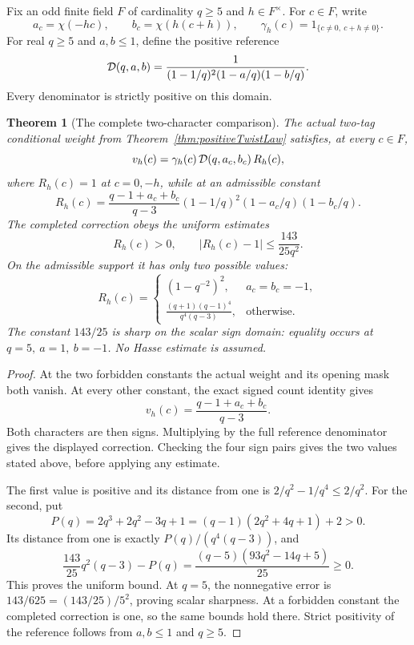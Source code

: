 \documentclass[11pt]{article}
\newtheorem{theorem}{Theorem}[section]
\begin{document}
Fix an odd finite field \(F\) of cardinality \(q\geq5\) and
\(h\in F^\times\). For \(c\in F\), write
\[
 a_c=\chi(-hc),\qquad b_c=\chi(h(c+h)),\qquad
 \gamma_h(c)=1_{\{c\ne0,\ c+h\ne0\}}.
\]
For real \(q\geq5\) and \(a,b\leq1\), define the positive reference
\[
 {\cal D}(q,a,b)=
       \frac1{(1-1/q)^2(1-a/q)(1-b/q)}.
\]
Every denominator is strictly positive on this domain.

\begin{theorem}[The complete two-character comparison]
\label{thm:twistTwoCharacter}
The actual two-tag conditional weight from
Theorem~\ref{thm:positiveTwistLaw} satisfies, at every \(c\in F\),
\[
       v_h(c)=\gamma_h(c)\,{\cal D}(q,a_c,b_c)\,R_h(c),
\]
where \(R_h(c)=1\) at \(c=0,-h\), while at an admissible constant
\[
 R_h(c)=
 \frac{q-1+a_c+b_c}{q-3}
            (1-1/q)^2(1-a_c/q)(1-b_c/q).
\]
The completed correction obeys the uniform estimates
\[
                 R_h(c)>0,\qquad
                 |R_h(c)-1|\leq\frac{143}{25q^2}.
\]
On the admissible support it has only two possible values:
\[
 R_h(c)=
 \begin{cases}
 (1-q^{-2})^2,&a_c=b_c=-1,\\[2pt]
 \displaystyle\frac{(q+1)(q-1)^4}{q^4(q-3)},&\text{otherwise}.
 \end{cases}
\]
The constant \(143/25\) is sharp on the scalar sign domain:
equality occurs at \(q=5,\ a=1,\ b=-1\).
No Hasse estimate is assumed.
\end{theorem}

\begin{proof}
At the two forbidden constants the actual weight and its opening mask
both vanish. At every other constant, the exact signed count identity gives
\[
                     v_h(c)=\frac{q-1+a_c+b_c}{q-3}.
\]
Both characters are then signs. Multiplying by the full reference
denominator gives the displayed correction. Checking the four sign
pairs gives the two values stated above, before applying any estimate.

The first value is positive and its distance from one is
\(2/q^2-1/q^4\leq2/q^2\).
For the second, put
\[
 P(q)=2q^3+2q^2-3q+1
              =(q-1)(2q^2+4q+1)+2>0.
\]
Its distance from one is exactly \(P(q)/(q^4(q-3))\), and
\[
 \frac{143}{25}q^2(q-3)-P(q)
       =\frac{(q-5)(93q^2-14q+5)}{25}\geq0.
\]
This proves the uniform bound. At \(q=5\), the nonnegative error is
\(143/625=(143/25)/5^2\), proving scalar sharpness.
At a forbidden constant the completed correction is one, so the same
bounds hold there. Strict positivity of the reference follows from
\(a,b\leq1\) and \(q\geq5\).
\end{proof}
\end{document}
